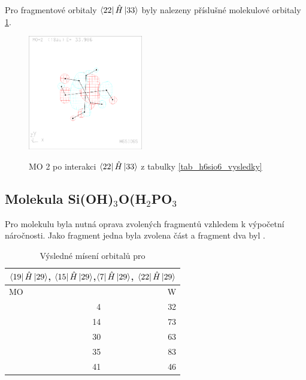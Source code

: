 \documentclass[
  digital, %
  table,   %
  lof,     %
  lot,     %
]{fithesis3}
\begin{document}
Pro fragmentové orbitaly $\bra{22}{\hat{H}}\ket{33}$ byly nalezeny příslušné molekulové orbitaly \ref{obr_h6sio6_MO_s3_2}.
  
  \begin{figure}[h]
\caption{MO 2 po interakci $\bra{22}{\hat{H}}\ket{33}$  z tabulky \ref{tab_h6sio6_vysledky}}
  \center
  \includegraphics[width=5cm]{h6sio6_obrazky/s3_2.eps}
  \label{obr_h6sio6_MO_s3_2}
  \end{figure}
 \subsection{Molekula Si(OH)$_3$O(H$_2$PO$_3$}
 Pro molekulu  byla nutná oprava zvolených fragmentů vzhledem k výpočetní náročnosti. Jako fragment jedna byla zvolena část  a fragment dva byl .  

\begin{table}[htbp]
\caption{Výsledné mísení orbitalů pro }
\begin{center}
\begin{tabular}{|r|r|}
\hline
\multicolumn{2}{|c|}{$\bra{19}{\hat{H}}\ket{29}$, $\bra{15}{\hat{H}}\ket{29}$,$\bra{7}{\hat{H}}\ket{29}$, $\bra{22}{\hat{H}}\ket{29}$} \\
\hline \hline
\multicolumn{1}{|l|}{MO} & \multicolumn{1}{r|}{W} \\ \hline
4 & 32 \\ \hline
14 & 73 \\ \hline
30 & 63 \\ \hline
35 & 83 \\ \hline
41 & 46 \\ \hline
\end{tabular}
\end{center}
\label{tab_sio3_vysledky}
\end{table}
\end{document}
